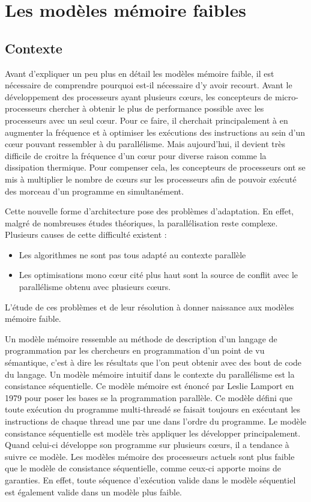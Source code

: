 \documentclass[12pt,a4paper]{article}
\begin{document}

\section{Les modèles mémoire faibles}

\subsection{Contexte}

Avant d'expliquer un peu plus en détail les modèles mémoire faible, il est nécessaire de comprendre pourquoi est-il nécessaire d'y avoir recourt. Avant le développement des processeurs ayant plusieurs cœurs, les concepteurs de micro-processeurs chercher à obtenir le plus de performance possible avec les processeurs avec un seul cœur. Pour ce faire, il cherchait principalement à en augmenter la fréquence et à optimiser les exécutions des instructions au sein d'un cœur pouvant ressembler à du parallélisme. Mais aujourd'hui, il devient très difficile de croitre la fréquence d'un cœur pour diverse raison comme la dissipation thermique. Pour compenser cela, les concepteurs de processeurs ont se mis à multiplier le nombre de cœurs sur les processeurs afin de pouvoir exécuté des morceau d'un programme en simultanément.

Cette nouvelle forme d'architecture pose des problèmes d'adaptation. En effet, malgré de nombreuses études théoriques, la parallélisation reste complexe. Plusieurs causes de cette difficulté existent :
\begin{itemize}
	\item Les algorithmes ne sont pas tous adapté au contexte parallèle
	\item Les optimisations mono cœur cité plus haut sont la source de conflit avec le parallélisme obtenu avec plusieurs cœurs. 
\end{itemize}
L'étude de ces problèmes et de leur résolution à donner naissance aux modèles mémoire faible.

Un modèle mémoire ressemble au méthode de description d'un langage de programmation par les chercheurs en programmation d'un point de vu sémantique, c'est à dire les résultats que l'on peut obtenir avec des bout de code du langage. Un modèle mémoire intuitif dans le contexte du parallélisme est la consistance séquentielle. Ce modèle mémoire est énoncé par Leslie Lamport en 1979 pour poser les bases se la programmation parallèle. Ce modèle défini que toute exécution du programme multi-threadé se faisait toujours en exécutant les instructions de chaque thread une par une dans l'ordre du programme. Le modèle  consistance séquentielle est modèle très appliquer les développer principalement. Quand celui-ci développe son programme sur plusieurs cœurs, il a tendance à suivre ce modèle. Les modèles mémoire des processeurs actuels sont plus faible que le modèle de consistance séquentielle, comme ceux-ci apporte moins de garanties. En effet, toute séquence d'exécution valide dans le modèle séquentiel est également valide dans un modèle plus faible.
\end{document}
